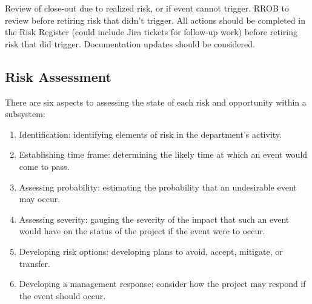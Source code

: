 Review of close-out due to realized risk, or if event cannot trigger.
RROB to review before retiring risk that didn't trigger.
All actions should be completed in the Risk Register (could include Jira tickets for follow-up work) before retiring risk that did trigger.
Documentation updates should be considered.

\subsection{Risk Assessment}

There are six aspects to assessing the state of each risk and opportunity within a subsystem:
\begin{enumerate}
\item Identification:  identifying elements of risk in the department’s activity.
\item Establishing time frame:  determining the likely time at which an event would come to pass.
\item Assessing probability:  estimating the probability that an undesirable event may occur.
\item Assessing severity:  gauging the severity of the impact that such an event would have on the status of the project if the event were to occur.
\item Developing risk options:  developing plans to avoid, accept, mitigate, or transfer.
\item Developing a management response: consider how the project may respond if the event should occur.
\end{enumerate}
